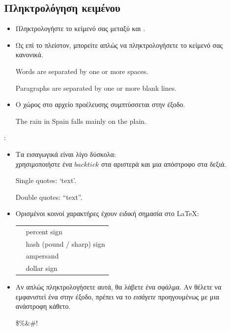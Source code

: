 \documentclass{beamer}
\begin{document}
\subsection{Πληκτρολόγηση κειμένου}
\begin{frame}[fragile]{\insertsubsection{}}
\small
\begin{itemize}
\item Πληκτρολογήστε το κείμενό σας μεταξύ \en {} \gr και \en {} \gr.
\item Ως επί το πλείστον, μπορείτε απλώς να πληκτρολογήσετε το κείμενό σας κανονικά.
\en
\begin{exampletwouptiny}
Words are separated by one or more
spaces.

Paragraphs are separated by one
or more blank lines.

\end{exampletwouptiny}
\gr
\item Ο χώρος στο αρχείο προέλευσης συμπτύσσεται στην έξοδο.
\en
\begin{exampletwouptiny}
The   rain       in Spain
falls mainly on the plain.
\end{exampletwouptiny}
\end{itemize}
\end{frame}
\gr
\begin{frame}[fragile]{\insertsubsection{}: }
\small
\begin{itemize}
\item Τα εισαγωγικά είναι λίγο δύσκολα:\\
χρησιμοποιήστε ένα $backtick$ \keystroke{\`{}} στα αριστερά και μια απόστροφο \keystroke{\'{}} στα δεξιά.
\en
\begin{exampletwouptiny}
Single quotes: `text'.

Double quotes: ``text''.
\end{exampletwouptiny}
\gr
\item Ορισμένοι κοινοί χαρακτήρες έχουν ειδική σημασία στο \LaTeX:\\[1ex]
\en
\begin{tabular}{cl}
\keystrokebftt{\%} & percent sign              \\
\keystrokebftt{\#} & hash (pound / sharp) sign \\
\keystrokebftt{\&} & ampersand                 \\
\keystrokebftt{\$} & dollar sign               \\
\end{tabular}
\gr
\item Αν απλώς πληκτρολογήσετε αυτά, θα λάβετε ένα σφάλμα. Αν θέλετε να εμφανιστεί ένα
στην έξοδο, πρέπει να το \emph{εισάγετε} προηγουμένως με μια ανάστροφη κάθετο.
\en
\begin{exampletwoup}
\$\%\&\#!
\end{exampletwoup}
\end{itemize}
\end{frame}
\end{document}
